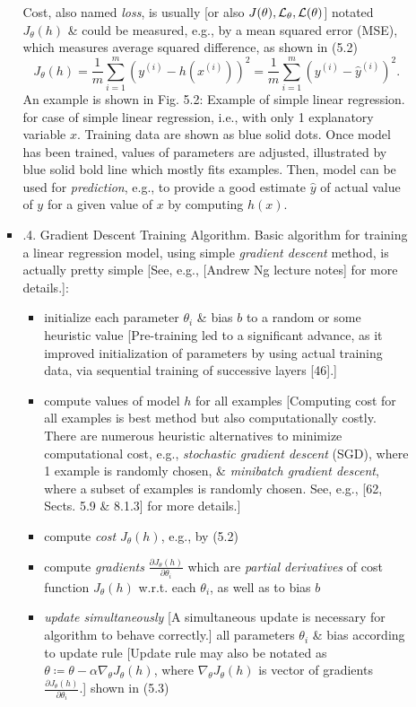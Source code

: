 \documentclass{article}
\begin{document}
\begin{itemize}
\begin{itemize}
\begin{itemize}
			Cost, also named {\it loss}, is usually [or also $J(\theta),{\cal L}_\theta,{\cal L}(\theta)$] notated $J_\theta(h)$ \& could be measured, e.g., by a mean squared error (MSE), which measures average squared difference, as shown in (5.2)
			\begin{equation*}
				J_\theta(h) = \frac{1}{m}\sum_{i=1}^m (y^{(i)} - h(x^{(i)}))^2 = \frac{1}{m}\sum_{i=1}^m (y^{(i)} - \hat{y}^{(i)})^2.
			\end{equation*}
			An example is shown in {\sf Fig. 5.2: Example of simple linear regression.} for case of simple linear regression, i.e., with only 1 explanatory variable $x$. Training data are shown as blue solid dots. Once model has been trained, values of parameters are adjusted, illustrated by blue solid bold line which mostly fits examples. Then, model can be used for {\it prediction}, e.g., to provide a good estimate $\hat{y}$ of actual value of $y$ for a given value of $x$ by computing $h(x)$.
			\item {.4. Gradient Descent Training Algorithm.} Basic algorithm for training a linear regression model, using simple {\it gradient descent} method, is actually pretty simple [See, e.g., [{\sc Andrew Ng} lecture notes] for more details.]:
			\begin{itemize}
				\item initialize each parameter $\theta_i$ \& bias $b$ to a random or some heuristic value [Pre-training led to a significant advance, as it improved initialization of parameters by using actual training data, via sequential training of successive layers [46].]
				\item compute values of model $h$ for all examples [Computing cost for all examples is best method but also computationally costly. There are numerous heuristic alternatives to minimize computational cost, e.g., {\it stochastic gradient descent} (SGD), where 1 example is randomly chosen, \& {\it minibatch gradient descent}, where a subset of examples is randomly chosen. See, e.g., [62, Sects. 5.9 \& 8.1.3] for more details.]
				\item compute {\it cost} $J_\theta(h)$, e.g., by (5.2)
				\item compute {\it gradients} $\frac{\partial J_\theta(h)}{\partial\theta_i}$ which are {\it partial derivatives} of cost function $J_\theta(h)$ w.r.t. each $\theta_i$, as well as to bias $b$
				\item {\it update simultaneously} [A simultaneous update is necessary for algorithm to behave correctly.] all parameters $\theta_i$ \& bias according to update rule [Update rule may also be notated as $\theta\coloneqq\theta - \alpha\nabla_\theta J_\theta(h)$, where $\nabla_\theta J_\theta(h)$ is vector of gradients $\frac{\partial J_\theta(h)}{\partial\theta_i}$.] shown in (5.3) 

\end{itemize}
\end{itemize}
\end{itemize}
\end{itemize}
\end{document}
